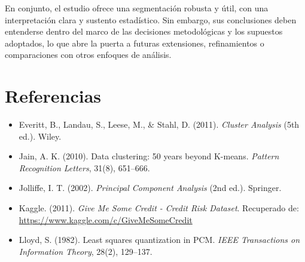 \documentclass[a4paper,12pt]{article}
\begin{document}
En conjunto, el estudio ofrece una segmentación robusta y útil, con una interpretación clara y sustento estadístico. Sin embargo, sus conclusiones deben entenderse dentro del marco de las decisiones metodológicas y los supuestos adoptados, lo que abre la puerta a futuras extensiones, refinamientos o comparaciones con otros enfoques de análisis.


\section{Referencias}

\begin{itemize}[leftmargin=1.2cm]

\item Everitt, B., Landau, S., Leese, M., \& Stahl, D. (2011). \textit{Cluster Analysis} (5th ed.). Wiley.

\item Jain, A. K. (2010). Data clustering: 50 years beyond K-means. \textit{Pattern Recognition Letters}, 31(8), 651–666.

\item Jolliffe, I. T. (2002). \textit{Principal Component Analysis} (2nd ed.). Springer.

\item Kaggle. (2011). \textit{Give Me Some Credit - Credit Risk Dataset}. Recuperado de: \url{https://www.kaggle.com/c/GiveMeSomeCredit}

\item Lloyd, S. (1982). Least squares quantization in PCM. \textit{IEEE Transactions on Information Theory}, 28(2), 129–137.

\end{itemize}
\end{document}
